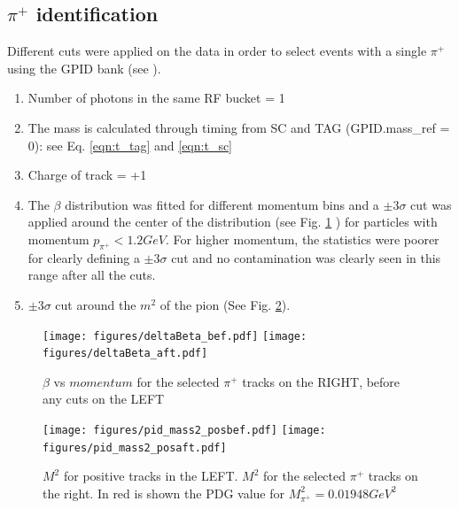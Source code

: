 \subsection{\texorpdfstring{$\pi^+$}{pi+} identification}
Different cuts were applied on the data in order to select events with a single $\pi^+$ using the GPID bank (see \cite{Pasyuk_gpid}).
\begin{enumerate}
  \item Number of photons in the same RF bucket = 1 
  \item The mass is calculated through timing from SC and TAG (GPID.mass\_ref = 0): see Eq. \ref{eqn:t_tag} and \ref{eqn:t_sc}
  \item Charge of track = +1
  \item The $\beta$ distribution was fitted for different momentum bins and a $\pm 3 \sigma$ cut was applied around the center of the distribution (see Fig. \ref{fig:beta_mom_pip} ) for particles with momentum $p_{\pi^+} < 1.2GeV$. For higher momentum, the statistics were poorer for clearly defining a $\pm 3 \sigma$ cut and no contamination was clearly seen in this range after all the cuts.
  \item  $\pm 3 \sigma$ cut around the $m^2$ of the pion (See Fig. \ref{fig:mass2_pip}).
\end{enumerate}
\begin{figure}[!htb]
  \begin{center}
    \texttt{[image: figures/deltaBeta\_bef.pdf]}
    \texttt{[image: figures/deltaBeta\_aft.pdf]} \\
    \caption{$\beta$ vs $momentum$ for the selected $\pi^+$ tracks on the RIGHT, before any cuts on the LEFT}
    \label{fig:beta_mom_pip}
  \end{center}
\end{figure}
\begin{figure}[!htb]
  \begin{center}
    \texttt{[image: figures/pid\_mass2\_posbef.pdf]}
    \texttt{[image: figures/pid\_mass2\_posaft.pdf]} \\
    \caption{$M^2$ for positive tracks in the LEFT. $M^2$ for the selected $\pi^+$ tracks on the right. In red is shown the PDG value for $M_{\pi^+}^2=0.01948 GeV^2$}
    \label{fig:mass2_pip}
  \end{center}
\end{figure}

